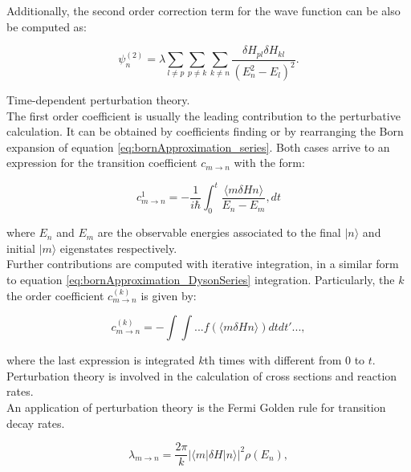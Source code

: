 \documentclass[openany]{book}
\begin{document}
Additionally, the second order correction term for the wave function can be also be computed as: 

\begin{equation} \label{eq:perturbationTheory_timeIndependent_psi2}
	\psi^{(2)}_n = \lambda  \sum_{l \neq p}  \sum_{p \neq k} \sum_{k \neq n}{\frac{\delta H_{pl}\delta H_{kl} }{(E^{2}_n - E_l)^2}}.
\end{equation}


Time-dependent perturbation theory.\\

The first order coefficient is usually the leading contribution to the perturbative calculation. It can be obtained by coefficients finding or by rearranging the Born expansion of equation \ref{eq:bornApproximation_series}. Both cases arrive to an expression for the transition coefficient  $c_{m\rightarrow n} $ with the form:

\begin{equation} \label{eq:perturbationTheory_timeDeependent_c}
	c^{1}_{m\rightarrow n} = - \frac{1}{i\hbar} \int_{0}^{t} \frac{\langle m \delta H n \rangle  } {E_n - E_m}, dt 
\end{equation}

where $E_n$ and  $E_m$ are the observable energies associated to the final $|n \rangle$ and initial  $|m \rangle$ eigenstates respectively. \\

Further contributions are computed with iterative integration, in a similar form to equation \ref{eq:bornApproximation_DysonSeries} integration. Particularly, the $k$the order coefficient  $c^{(k)}_{m\rightarrow n}$ is given by:

\begin{equation} \label{eq:perturbationTheory_timeDeependent_ck}
	c^{(k)}_{m\rightarrow n} = - \int \int ...  f(\langle m \delta H  n \rangle  ) dt dt' ... ,
\end{equation}

where the last expression is integrated $k$th times with different from 0 to $t$. \\

Perturbation theory is involved in the calculation of cross sections and reaction rates. \\

An application of perturbation theory is the Fermi Golden rule for transition decay rates. 

\begin{equation} \label{eq:perturbationTheory_fermiGoldenRule_rate}
	\lambda_{m\rightarrow n} = \frac{2\pi}{k} |\langle m | \delta H| n \rangle|^2 \rho(E_n),
\end{equation}
\end{document}

